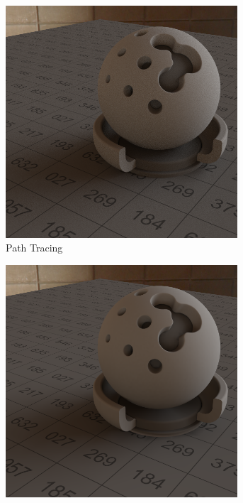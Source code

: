 		\begin{figure}[p]
			\begin{subfigure}[t]{0.245\textwidth}
				\center
				\includegraphics[width=0.95\textwidth]{pic/irrmap-shaderball_e-ref.png}
				\caption{Path Tracing}
			\end{subfigure}
			\begin{subfigure}[t]{0.245\textwidth}
				\center
				\includegraphics[width=0.95\textwidth]{pic/irrmap-shaderball_e-vmap.png}

\end{subfigure}
\end{figure}
